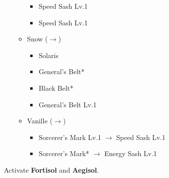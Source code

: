 \begin{menu}
\begin{itemize}
\begin{itemize}
\begin{itemize}
					\item Speed Sash Lv.1
					\item Speed Sash Lv.1
				\end{itemize}
			\item Snow ($\rightarrow$)
				\begin{itemize}
					\item Solaris
					\item General's Belt*
					\item Black Belt*
					\item General's Belt Lv.1
				\end{itemize}
			\item Vanille ($\rightarrow$)
				\begin{itemize}
					\item Sorcerer's Mark Lv.1 $\rightarrow$ Speed Sash Lv.1
					\item Sorcerer's Mark* $\rightarrow$ Energy Sash Lv.1
				\end{itemize}
		\end{itemize}
	\end{itemize}
\end{menu}

\renewcommand{\first}{[1] Cerberus (\com/\com/\com)}
\renewcommand{\second}{[2] Solidarity (\com/\sen/\med)}
\renewcommand{\third}{[3] Delta Attack (\com/\sen/\rav)}
\renewcommand{\fourth}{[4] Mystic Tower (\rav/\sen/\rav)}
\renewcommand{\fifth}{[5] Protection (\syn/\sen/\med)}
\renewcommand{\sixth}{[6] Tortoise (\sen/\sen/\sen)}

Activate \textbf{Fortisol} and \textbf{Aegisol}.
\vfill

